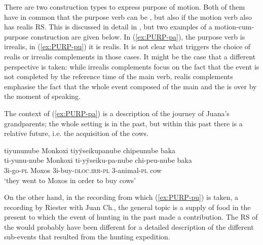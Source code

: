 %
%
There are two construction types to express purpose of motion. Both of them have in common that the purpose verb can be , but also  if the motion verb also has realis RS. This is discussed in detail in , but two examples of a motion-cum-purpose construction are given below. In (\ref{ex:PURP-pa}), the purpose verb is irrealis, in (\ref{ex:PURP-pu}) it is realis. It is not clear what triggers the choice of realis or irrealis complements in those cases. It might be the case that a different perspective is taken: while irrealis complements focus on the fact that the event is not completed by the reference time of the main verb, realis complements emphasise the fact that the whole event composed of the main and the  is over by the moment of speaking.

The context of (\ref{ex:PURP-pa}) is a description of the journey of Juana’s grandparents; the whole setting is in the past, but within this past there is a relative future, i.e. the acquisition of the cows.

\ea\label{ex:PURP-pa}
\begingl 
\glpreamble tiyununube Monkoxi tiyÿseikupanube chipeunube baka\\
\gla ti-yunu-nube Monkoxi ti-yÿseiku-pa-nube chi-peu-nube baka\\ 
\glb 3i-go-\textsc{pl} Moxos 3i-buy-\textsc{dloc.irr}-\textsc{pl} 3-animal-\textsc{pl} cow\\ 
\glft ‘they went to Moxos in order to buy cows’
 \trailingcitation{[jxx-p151016l-2]}
\xe
{}

On the other hand, in the recording from which (\ref{ex:PURP-pu}) is taken, a recording by Riester with Juan Ch., the general topic is a supply of food in the present to which the event of hunting in the past made a contribution. The RS of the  would probably have been different for a detailed description of the different sub-events that resulted from the hunting expedition.


